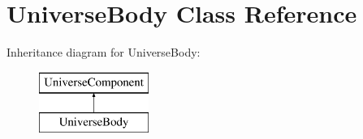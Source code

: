 \hypertarget{classUniverseBody}{}\section{Universe\+Body Class Reference}
\label{classUniverseBody}
Inheritance diagram for Universe\+Body\+:\begin{figure}[H]
\begin{center}
\leavevmode
\includegraphics[height=2.000000cm]{classUniverseBody}
\end{center}
\end{figure}

